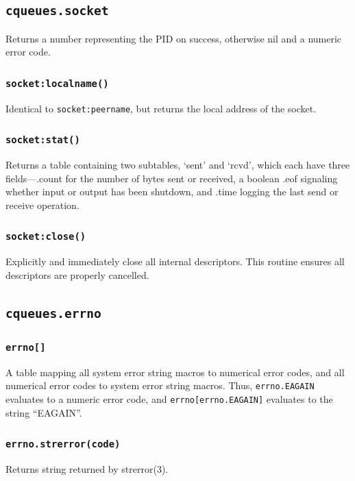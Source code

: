 \documentclass[11pt, oneside]{memoir}
\newcommand*{\fn}[1]{\texttt{#1}\xspace}
\newcounter{toccols}
\newenvironment{Module}[1]{
	\subsection{\texttt{#1}}
	\addtocontents{toc}{
		\protect\begin{multicols}{\value{toccols}}
	}
}{
	\addtocontents{toc}{\protect\end{multicols}}
}
\begin{document}
\begin{Module}{cqueues.socket}
Returns a number representing the PID on success, otherwise nil and a numeric error code.

\subsubsection[\fn{socket:localname}]{\fn{socket:localname()}}

Identical to \fn{socket:peername}, but returns the local address of the socket.

\subsubsection[\fn{socket:stat}]{\fn{socket:stat()}}

Returns a table containing two subtables, `sent' and `rcvd', which each have three fields---.count for the number of bytes sent or received, a boolean .eof  signaling whether input or output has been shutdown, and .time logging the last send or receive operation.

\subsubsection[\fn{socket:close}]{\fn{socket:close()}}
Explicitly and immediately close all internal descriptors. This routine ensures all descriptors are properly cancelled.

\end{Module}

\begin{Module}{cqueues.errno}

\subsubsection[\fn{errno[]}]{\fn{errno[]}}
A table mapping all system error string macros to numerical error codes, and all numerical error codes to system error string macros. Thus, \texttt{errno.EAGAIN} evaluates to a numeric error code, and \texttt{errno[errno.EAGAIN]} evaluates to the string ``EAGAIN''.

\subsubsection[\fn{errno.strerror}]{\fn{errno.strerror(code)}}
Returns string returned by strerror(3).

\end{Module}
\end{document}
